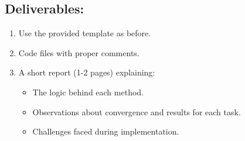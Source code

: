 \documentclass[12pt]{article}
\begin{document}
\subsection*{Deliverables:}
\begin{enumerate}
    \item Use the provided template as before.
    \item Code files with proper comments.
    \item A short report (1-2 pages) explaining:
    \begin{itemize}
        \item The logic behind each method.
        \item Observations about convergence and results for each task.
        \item Challenges faced during implementation.
    \end{itemize}
\end{enumerate}
\end{document}
